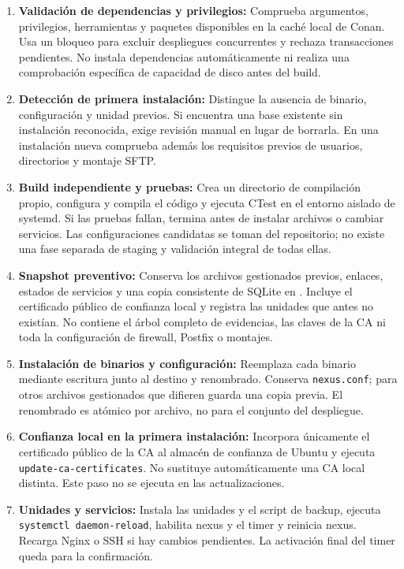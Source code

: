 \documentclass[10pt,a4paper]{article}
\begin{document}
\begin{enumerate}[leftmargin=*]
    \item \textbf{Validación de dependencias y privilegios:} Comprueba argumentos, privilegios, herramientas y paquetes disponibles en la caché local de Conan. Usa un bloqueo para excluir despliegues concurrentes y rechaza transacciones pendientes. No instala dependencias automáticamente ni realiza una comprobación específica de capacidad de disco antes del build.
    \item \textbf{Detección de primera instalación:} Distingue la ausencia de binario, configuración y unidad previos. Si encuentra una base existente sin instalación reconocida, exige revisión manual en lugar de borrarla. En una instalación nueva comprueba además los requisitos previos de usuarios, directorios y montaje SFTP.
    \item \textbf{Build independiente y pruebas:} Crea un directorio de compilación propio, configura y compila el código y ejecuta CTest en el entorno aislado de systemd. Si las pruebas fallan, termina antes de instalar archivos o cambiar servicios. Las configuraciones candidatas se toman del repositorio; no existe una fase separada de staging y validación integral de todas ellas.
    \item \textbf{Snapshot preventivo:} Conserva los archivos gestionados previos, enlaces, estados de servicios y una copia consistente de SQLite en . Incluye el certificado público de confianza local y registra las unidades que antes no existían. No contiene el árbol completo de evidencias, las claves de la CA ni toda la configuración de firewall, Postfix o montajes.
    \item \textbf{Instalación de binarios y configuración:} Reemplaza cada binario mediante escritura junto al destino y renombrado. Conserva \texttt{nexus.conf}; para otros archivos gestionados que difieren guarda una copia previa. El renombrado es atómico por archivo, no para el conjunto del despliegue.
    \item \textbf{Confianza local en la primera instalación:} Incorpora únicamente el certificado público de la CA al almacén de confianza de Ubuntu y ejecuta \texttt{update-ca-certificates}. No sustituye automáticamente una CA local distinta. Este paso no se ejecuta en las actualizaciones.
    \item \textbf{Unidades y servicios:} Instala las unidades y el script de backup, ejecuta \texttt{systemctl daemon-reload}, habilita nexus y el timer y reinicia nexus. Recarga Nginx o SSH si hay cambios pendientes. La activación final del timer queda para la confirmación.

\end{enumerate}
\end{document}

